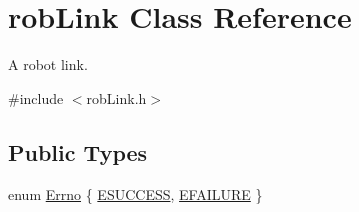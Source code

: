 \hypertarget{classrob_link}{}\section{rob\+Link Class Reference}
\label{classrob_link}


A robot link.  




{\ttfamily \#include $<$rob\+Link.\+h$>$}

\subsection*{Public Types}
\begin{DoxyCompactItemize}
\item 
enum \hyperlink{classrob_link_aeafaa7aaa6cb47af0db3b746606c0bd0}{Errno} \{ \hyperlink{classrob_link_aeafaa7aaa6cb47af0db3b746606c0bd0a50ca3684acd35bf81c30fbb7d9fe5652}{E\+S\+U\+C\+C\+E\+S\+S}, 
\hyperlink{classrob_link_aeafaa7aaa6cb47af0db3b746606c0bd0a0506973f35ceab0b466f40856a327ca7}{E\+F\+A\+I\+L\+U\+R\+E}
 \}
\end{DoxyCompactItemize}
